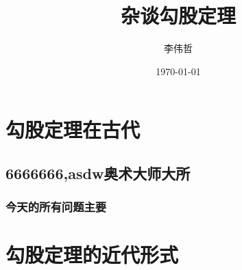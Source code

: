 \documentclass[UTF8]{ctexart}
\title{杂谈勾股定理}
\author{李伟哲}
\date{\today}
\begin{document}

    \maketitle  %
    \tableofcontents    %
    \section{勾股定理在古代}
    \subsection{6666666,asdw奥术大师大所}
    \subsubsection{今天的所有问题主要}
    \section{勾股定理的近代形式}
    
\end{document}
